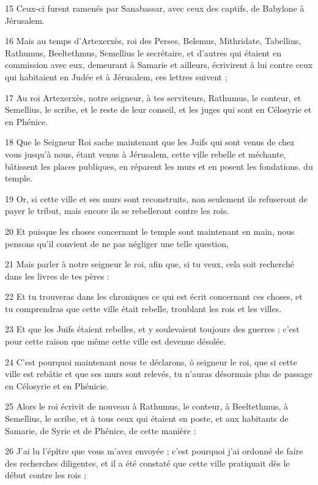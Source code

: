 \par 15 Ceux-ci furent ramenés par Sanabassar, avec ceux des captifs, de Babylone à Jérusalem.
\par 16 Mais au temps d'Artexerxès, roi des Perses, Belemus, Mithridate, Tabellius, Rathumus, Beeltethmus, Semellius le secrétaire, et d'autres qui étaient en commission avec eux, demeurant à Samarie et ailleurs, écrivirent à lui contre ceux qui habitaient en Judée et à Jérusalem, ces lettres suivent ;
\par 17 Au roi Artexerxès, notre seigneur, à tes serviteurs, Rathumus, le conteur, et Semellius, le scribe, et le reste de leur conseil, et les juges qui sont en Célosyrie et en Phénice.
\par 18 Que le Seigneur Roi sache maintenant que les Juifs qui sont venus de chez vous jusqu'à nous, étant venus à Jérusalem, cette ville rebelle et méchante, bâtissent les places publiques, en réparent les murs et en posent les fondations. du temple.
\par 19 Or, si cette ville et ses murs sont reconstruits, non seulement ils refuseront de payer le tribut, mais encore ils se rebelleront contre les rois.
\par 20 Et puisque les choses concernant le temple sont maintenant en main, nous pensons qu'il convient de ne pas négliger une telle question,
\par 21 Mais parler à notre seigneur le roi, afin que, si tu veux, cela soit recherché dans les livres de tes pères :
\par 22 Et tu trouveras dans les chroniques ce qui est écrit concernant ces choses, et tu comprendras que cette ville était rebelle, troublant les rois et les villes.
\par 23 Et que les Juifs étaient rebelles, et y soulevaient toujours des guerres ; c'est pour cette raison que même cette ville est devenue désolée.
\par 24 C'est pourquoi maintenant nous te déclarons, ô seigneur le roi, que si cette ville est rebâtie et que ses murs sont relevés, tu n'auras désormais plus de passage en Célosyrie et en Phénicie.
\par 25 Alors le roi écrivit de nouveau à Rathumus, le conteur, à Beeltethmus, à Semellius, le scribe, et à tous ceux qui étaient en poste, et aux habitants de Samarie, de Syrie et de Phénice, de cette manière :
\par 26 J'ai lu l'épître que vous m'avez envoyée ; c'est pourquoi j'ai ordonné de faire des recherches diligentes, et il a été constaté que cette ville pratiquait dès le début contre les rois ;

